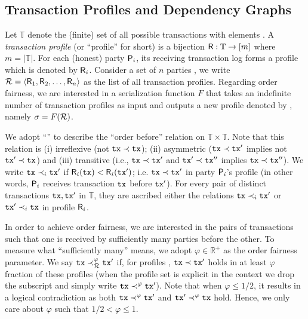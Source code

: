 \subsection{Transaction Profiles and Dependency Graphs}
\label{subsec:transaction-profiles-dependency-graphs}

Let $\mathbb{T}$ denote the (finite) set of all possible transactions with elements \tx.
%
A \emph{transaction profile} (or ``profile'' for short) is a bijection $\mathsf{R} : \mathbb{T} \rightarrow [m]$ where $m = |\mathbb{T}|$.
%
For each (honest) party $\mathsf{P}_i$, its receiving transaction log forms a profile which is denoted by $\mathsf{R}_i$.
%
Consider a set of $n$ parties \setParties, we write $\mathcal{R} = \langle \mathsf{R}_1, \mathsf{R}_2, \ldots, \mathsf{R}_n \rangle$ as the list of all transaction profiles.
%
Regarding order fairness, we are interested in a serialization function $F$ that takes an indefinite number of transaction profiles \profileSet as input and outputs a new profile denoted by \orderOutput, namely $\sigma = F(\mathcal{R})$.

We adopt ``\before'' to describe the ``order before'' relation on $\mathbb{T} \times \mathbb{T}$.
%
Note that this relation is (i) irreflexive (not $\mathtt{tx} \prec \mathtt{tx}$); (ii) asymmetric ($\mathtt{tx} \prec \mathtt{tx}'$ implies not $\mathtt{tx}' \prec \mathtt{tx}$) and (iii) transitive (i.e., $\mathtt{tx} \prec \mathtt{tx}'$ and $\mathtt{tx}' \prec \mathtt{tx}''$ implies $\mathtt{tx} \prec \mathtt{tx}''$).
%
We write $\mathtt{tx} \prec_i \mathtt{tx}'$ if $\mathsf{R}_i(\mathtt{tx}) < \mathsf{R}_i(\mathtt{tx}')$; i.e. $\mathtt{tx} \prec \mathtt{tx}'$ in party $\mathsf{P}_i$'s profile (in other words, $\mathsf{P}_i$ receives transaction $\mathtt{tx}$ before $\mathtt{tx}'$).
%
For every pair of distinct transactions $\mathtt{tx}, \mathtt{tx}'$ in $\mathbb{T}$, they are ascribed either the relations $\mathtt{tx} \prec_i \mathtt{tx}'$ or $\mathtt{tx}' \prec_i \mathtt{tx}$ in profile $\mathsf{R}_i$.

In order to achieve order fairness, we are interested in the pairs of transactions such that one is received by sufficiently many parties before the other.
%
To measure what ``sufficiently many'' means, we adopt $\varphi \in \mathbb{R}^+$ as the order fairness parameter.
%
We say $\mathtt{tx} \prec^\varphi_\mathcal{R} \mathtt{tx}'$ if, for profiles \profileSet, $\mathtt{tx} \prec \mathtt{tx}'$ holds in at least $\varphi$ fraction of these profiles (when the profile set is explicit in the context we drop the subscript and simply write $\mathtt{tx} \prec^\varphi \mathtt{tx}'$).
%
Note that when $\varphi \le 1 / 2$, it results in a logical contradiction as both $\mathtt{tx} \prec^\varphi \mathtt{tx}'$ and $\mathtt{tx}' \prec^\varphi \mathtt{tx}$ hold.
%
Hence, we only care about $\varphi$ such that $1 / 2 < \varphi \le 1$.

